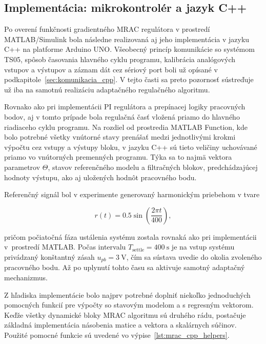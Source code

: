 \subsection{Implementácia: mikrokontrolér a jazyk C++}
\label{sec:mrac_cpp_implementation}

Po overení funkčnosti gradientného MRAC regulátora v prostredí
MATLAB/Simulink bola následne realizovaná aj jeho implementácia
v jazyku C++ na platforme Arduino UNO. Všeobecný princíp komunikácie
so systémom TS05, spôsob časovania hlavného cyklu programu, kalibrácia
analógových vstupov a výstupov a záznam dát cez sériový port boli už
opísané v podkapitole~\ref{sec:komunikacia_cpp}. V tejto časti sa preto
pozornosť sústreďuje už iba na samotnú realizáciu adaptačného regulačného
algoritmu.

Rovnako ako pri implementácii PI regulátora a prepínacej logiky pracovných
bodov, aj v tomto prípade bola regulačná časť vložená priamo do hlavného
riadiaceho cyklu programu. Na rozdiel od prostredia MATLAB Function,
kde bolo potrebné všetky vnútorné stavy prenášať medzi jednotlivými krokmi
výpočtu cez vstupy a výstupy bloku, v jazyku C++ sú tieto veličiny uchovávané
priamo vo vnútorných premenných programu. Týka sa to najmä vektora parametrov
$\Theta$, stavov referenčného modelu a filtračných blokov, predchádzajúcej
hodnoty výstupu, ako aj uložených hodnôt pracovného bodu.

Referenčný signál bol v experimente generovaný harmonickým priebehom
v tvare

\begin{equation}
	r(t) = 0.5 \sin\!\left(\frac{2\pi t}{400}\right),
	\label{eq:mrac_cpp_reference}
\end{equation}

pričom počiatočná fáza ustálenia systému zostala rovnaká ako pri implementácii
v~prostredí MATLAB. Počas intervalu $T_{\mathrm{settle}} = 400~\mathrm{s}$
je na vstup systému privádzaný konštantný zásah $u_{pb} = 3~\mathrm{V}$,
čím sa sústava uvedie do okolia zvoleného pracovného bodu. Až po uplynutí
tohto času sa aktivuje samotný adaptačný mechanizmus.

Z hľadiska implementácie bolo najprv potrebné doplniť niekoľko jednoduchých
pomocných funkcií pre výpočty so stavovým modelom a s regresným vektorom.
Keďže všetky dynamické bloky MRAC algoritmu sú druhého rádu, postačuje
základná implementácia násobenia matice a vektora a skalárnych súčinov.
Použité pomocné funkcie sú uvedené vo výpise~\ref{lst:mrac_cpp_helpers}.


